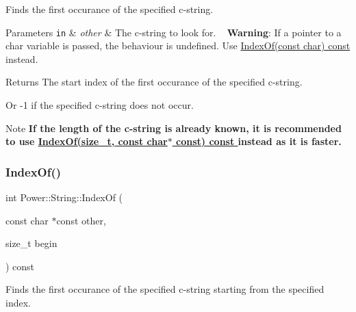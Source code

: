 Finds the first occurance of the specified c-\/string. 


\begin{DoxyParams}[1]{Parameters}
\mbox{\tt in}  & {\em other} & The c-\/string to look for. ~\newline
 {\bfseries Warning}\+: If a pointer to a char variable is passed, the behaviour is undefined. Use \hyperlink{class_power_1_1_string_af1bd7ca5bdef376538e580fd61d7fb1d}{Index\+Of(const char) const }instead. \\
\hline
\end{DoxyParams}
\begin{DoxyReturn}{Returns}
The start index of the first occurance of the specified c-\/string. 

Or -\/1 if the specified c-\/string does not occur. 
\end{DoxyReturn}
\begin{DoxyNote}{Note}
{\bfseries If the length of the c-\/string is already known, it is recommended to use \hyperlink{class_power_1_1_string_a489427963f47ef1ab11dff53218e8fdd}{Index\+Of(size\+\_\+t, const char$\ast$ const) const }instead as it is faster.} 
\end{DoxyNote}
\mbox{\label{class_power_1_1_string_a4ddb609f41c44132b4f3214597f32011}} 
\subsubsection{\texorpdfstring{Index\+Of()}{IndexOf()}\hspace{0.1cm}{\footnotesize\ttfamily [5/12]}}
{\footnotesize\ttfamily int Power\+::\+String\+::\+Index\+Of (\begin{DoxyParamCaption}\item[{const char $\ast$const}]{other,  }\item[{size\+\_\+t}]{begin }\end{DoxyParamCaption}) const\hspace{0.3cm}{\ttfamily [inline]}}



Finds the first occurance of the specified c-\/string starting from the specified index. 


